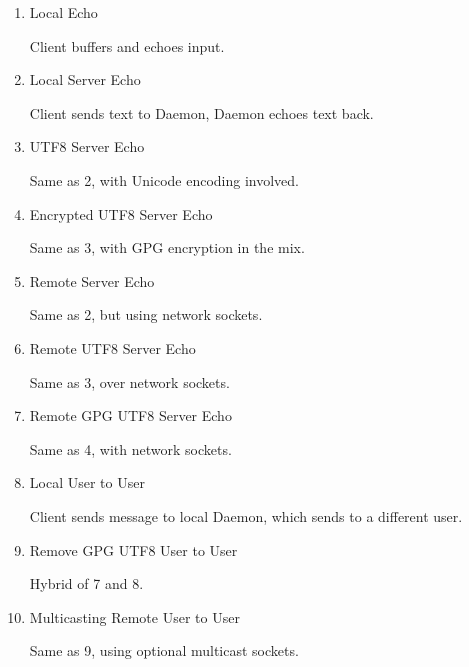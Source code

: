 \begin{table}[ht]

\begin{center}

\begin{enumerate}


\item Local Echo 

	\subitem Client buffers and echoes input.

\item Local Server Echo 

	\subitem Client sends text to Daemon, Daemon echoes text back.

\item UTF8 Server Echo 

	\subitem Same as 2, with Unicode encoding involved.

\item Encrypted UTF8 Server Echo 

	\subitem Same as 3, with GPG encryption in the mix.

\item Remote Server Echo 

	\subitem Same as 2, but using network sockets.

\item Remote UTF8 Server Echo 

	\subitem Same as 3, over network sockets.

\item Remote GPG UTF8 Server Echo 

	\subitem Same as 4, with network sockets.

\item Local User to User 

	\subitem Client sends message to local Daemon, which sends to a 
	different user.

\item Remove GPG UTF8 User to User 

	\subitem Hybrid of 7 and 8.

\item Multicasting Remote User to User 

	\subitem Same as 9, using optional multicast sockets.

\end{enumerate}

\end{center}

\caption{List of Initial Milestones}

\end{table}
